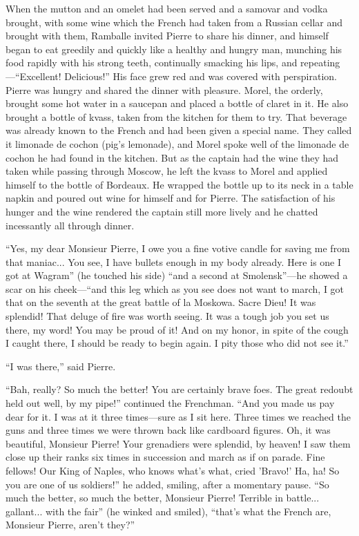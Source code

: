 When the mutton and an omelet had been served and a samovar and
vodka brought, with some wine which the French had taken from a
Russian cellar and brought with them, Ramballe invited Pierre to
share his dinner, and himself began to eat greedily and quickly
like a healthy and hungry man, munching his food rapidly with his
strong teeth, continually smacking his lips, and
repeating---``Excellent! Delicious!'' His face grew red and was
covered with perspiration. Pierre was hungry and shared the
dinner with pleasure. Morel, the orderly, brought some hot water
in a saucepan and placed a bottle of claret in it. He also
brought a bottle of kvass, taken from the kitchen for them to
try. That beverage was already known to the French and had been
given a special name. They called it limonade de cochon (pig's
lemonade), and Morel spoke well of the limonade de cochon he had
found in the kitchen. But as the captain had the wine they had
taken while passing through Moscow, he left the kvass to Morel
and applied himself to the bottle of Bordeaux. He wrapped the
bottle up to its neck in a table napkin and poured out wine for
himself and for Pierre. The satisfaction of his hunger and the
wine rendered the captain still more lively and he chatted
incessantly all through dinner.

``Yes, my dear Monsieur Pierre, I owe you a fine votive candle
for saving me from that maniac... You see, I have bullets enough
in my body already. Here is one I got at Wagram'' (he touched his
side) ``and a second at Smolensk''---he showed a scar on his
cheek---``and this leg which as you see does not want to march, I
got that on the seventh at the great battle of la Moskowa. Sacre
Dieu! It was splendid! That deluge of fire was worth seeing. It
was a tough job you set us there, my word! You may be proud of
it! And on my honor, in spite of the cough I caught there, I
should be ready to begin again. I pity those who did not see
it.''

``I was there,'' said Pierre.

``Bah, really? So much the better! You are certainly brave
foes. The great redoubt held out well, by my pipe!'' continued
the Frenchman. ``And you made us pay dear for it. I was at it
three times---sure as I sit here. Three times we reached the guns
and three times we were thrown back like cardboard figures. Oh,
it was beautiful, Monsieur Pierre! Your grenadiers were splendid,
by heaven! I saw them close up their ranks six times in
succession and march as if on parade. Fine fellows! Our King of
Naples, who knows what's what, cried 'Bravo!' Ha, ha! So you are
one of us soldiers!'' he added, smiling, after a momentary
pause. ``So much the better, so much the better, Monsieur Pierre!
Terrible in battle...  gallant... with the fair'' (he winked and
smiled), ``that's what the French are, Monsieur Pierre, aren't
they?''

